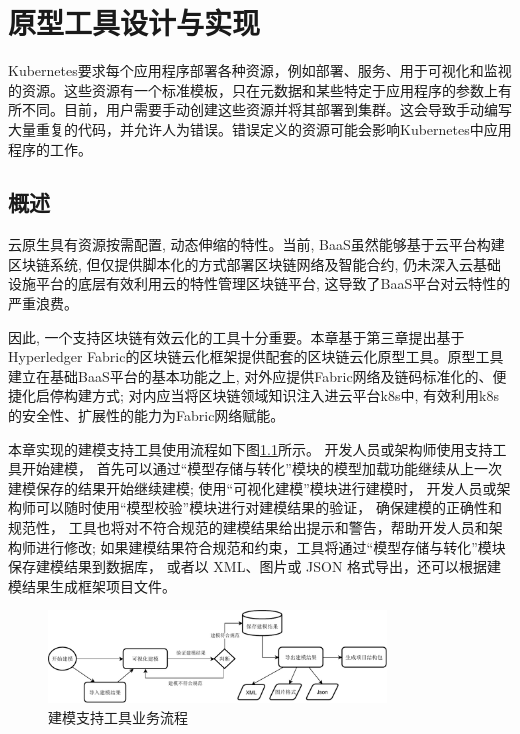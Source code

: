 \chapter{原型工具设计与实现}


Kubernetes要求每个应用程序部署各种资源，例如部署、服务、用于可视化和监视的资源。这些资源有一个标准模板，只在元数据和某些特定于应用程序的参数上有所不同。目前，用户需要手动创建这些资源并将其部署到集群。这会导致手动编写大量重复的代码，并允许人为错误。错误定义的资源可能会影响Kubernetes中应用程序的工作。

\section{概述}


云原生具有资源按需配置, 动态伸缩的特性。当前, BaaS虽然能够基于云平台构建区块链系统, 但仅提供脚本化的方式部署区块链网络及智能合约, 仍未深入云基础设施平台的底层有效利用云的特性管理区块链平台, 这导致了BaaS平台对云特性的严重浪费。

因此, 一个支持区块链有效云化的工具十分重要。本章基于第三章提出基于Hyperledger Fabric的区块链云化框架提供配套的区块链云化原型工具。原型工具建立在基础BaaS平台的基本功能之上, 对外应提供Fabric网络及链码标准化的、便捷化启停构建方式; 对内应当将区块链领域知识注入进云平台k8s中, 有效利用k8s的安全性、扩展性的能力为Fabric网络赋能。




本章实现的建模支持工具使用流程如下图\ref{toolprocess}所示。
开发人员或架构师使用支持工具开始建模，
首先可以通过“模型存储与转化”模块的模型加载功能继续从上一次建模保存的结果开始继续建模;
使用“可视化建模”模块进行建模时，
开发人员或架构师可以随时使用“模型校验”模块进行对建模结果的验证，
确保建模的正确性和规范性，
工具也将对不符合规范的建模结果给出提示和警告，帮助开发人员和架构师进行修改;
如果建模结果符合规范和约束，工具将通过“模型存储与转化”模块保存建模结果到数据库， 
或者以 XML、图片或 JSON 格式导出，还可以根据建模结果生成框架项目文件。


\begin{figure}[!htbp] %
    \centering %
    \includegraphics[width=0.8\textwidth]{FIGs/chapter4/toolprocess.pdf} %
    \caption{建模支持工具业务流程} %
    \label{toolprocess} %
\end{figure}%


